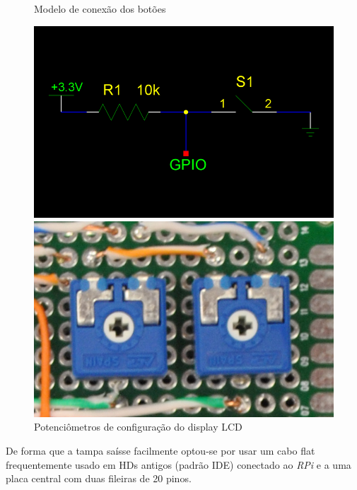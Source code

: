 \documentclass[
		12pt,				%
		openright,			%
		oneside,			%
		a4paper,			%
		chapter=TITLE,		%
		english,			%
		brazil				%
	]{abntex2}
\begin{document}
\begin{figure}[htb]
	\centering
 	\begin{minipage}{0.45\textwidth}
		\centering
		\caption{\label{fig:push-btn-sketch}Modelo de conexão dos botões}
		\includegraphics[width=1\textwidth]{img/push-btn-sketch.png}
	\end{minipage}
	\hfill
	\begin{minipage}{0.45\textwidth}
		\centering
		\caption{\label{fig:potentiometer}Potenciômetros de configuração do display LCD}
		\includegraphics[width=1\textwidth]{img/potentiometer.jpg}
	\end{minipage}
\end{figure}

De forma que a tampa saísse facilmente optou-se por usar um cabo flat frequentemente usado em HDs antigos (padrão IDE) conectado ao \textit{RPi} e a uma placa central com duas fileiras de 20 pinos.
\end{document}
